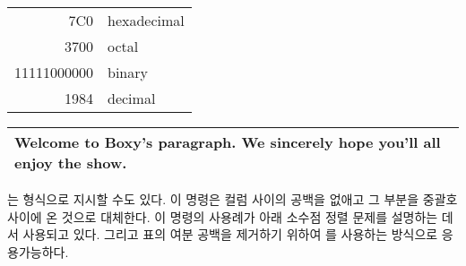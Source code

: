 

\begin{example}
\begin{tabular}{|r|l|}
\hline
7C0 & hexadecimal \\
3700 & octal \\ \cline{2-2}
11111000000 & binary \\
\hline \hline
1984 & decimal \\
\hline
\end{tabular}
\end{example}

\vspace{-.5\onelineskip}

\begin{example}
\begin{tabular}{|p{4.7cm}|}
\hline
Welcome to Boxy's paragraph.
We sincerely hope you'll
all enjoy the show.\\
\hline
\end{tabular}
\end{example}

는  형식으로 지시할 수도 있다.
이 명령은 컬럼 사이의 공백을 없애고 그 부분을 중괄호 사이에 온 것으로 대체한다.
이 명령의 사용례가 아래 소수점 정렬 문제를 설명하는 데서 사용되고 있다.
그리고 표의 여분 공백을 제거하기 위하여 를 사용하는 방식으로 응용가능하다.

